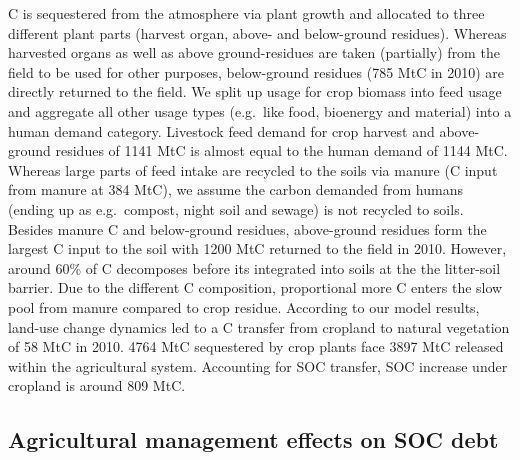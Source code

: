 \documentclass[gc, manuscript]{copernicus}
\begin{document}
C is sequestered from the atmosphere via plant growth and allocated to three different plant parts (harvest organ, above- and below-ground residues). Whereas harvested organs as well as above ground-residues are taken (partially) from the field to be used for other purposes, below-ground residues (785 MtC in 2010) are directly returned to the field. We split up usage for crop biomass into feed usage and aggregate all other usage types (e.g.~like food, bioenergy and material) into a human demand category. Livestock feed demand for crop harvest and above-ground residues of 1141 MtC is almost equal to the human demand of 1144 MtC. Whereas large parts of feed intake are recycled to the soils via manure (C input from manure at 384 MtC), we assume the carbon demanded from humans (ending up as e.g.~compost, night soil and sewage) is not recycled to soils. Besides manure C and below-ground residues, above-ground residues form the largest C input to the soil with 1200 MtC returned to the field in 2010. However, around 60\% of C decomposes before its integrated into soils at the the litter-soil barrier. Due to the different C composition, proportional more C enters the slow pool from manure compared to crop residue. According to our model results, land-use change dynamics led to a C transfer from cropland to natural vegetation of 58 MtC in 2010. 4764 MtC sequestered by crop plants face 3897 MtC released within the agricultural system. Accounting for SOC transfer, SOC increase under cropland is around 809 MtC.

\hypertarget{agricultural-management-effects-on-soc-debt}{%
\subsection{Agricultural management effects on SOC debt}\label{agricultural-management-effects-on-soc-debt}}
\end{document}
